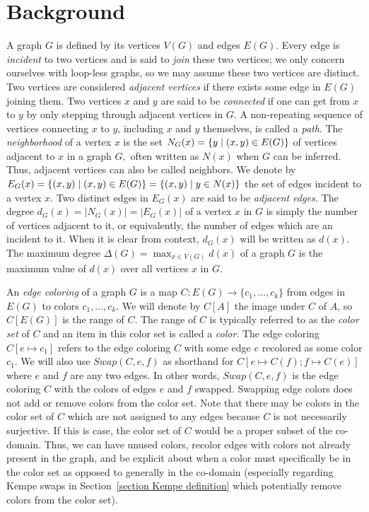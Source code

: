 \section{Background}\label{section background}
A graph $G$ is defined by its vertices $V(G)$ and edges $E(G).$ Every edge is \textit{incident} to two vertices and is said to \textit{join} these two vertices; we only concern ourselves with loop-less graphs, so we may assume these two vertices are distinct. Two vertices are considered \textit{adjacent vertices} if there exists some edge in $E(G)$ joining them. Two vertices $x$ and $y$ are said to be \textit{connected} if one can get from $x$ to $y$ by only stepping through adjacent vertices in $G.$ A non-repeating sequence of vertices connecting $x$ to $y$, including $x$ and $y$ themselves, is called a \textit{path}. The \textit{neighborhood} of a vertex $x$ is the set $N_G(x) = \{y \mid (x, y) \in E(G)\}$ of vertices adjacent to $x$ in a graph $G,$ often written as $N(x)$ when $G$ can be inferred. Thus, adjacent vertices can also be called neighbors. We denote by $E_G(x) = \{(x, y) \mid (x, y) \in E(G)\} = \{(x, y) \mid y \in N(x)\}$ the set of edges incident to a vertex $x.$ Two distinct edges in $E_G(x)$ are said to be \textit{adjacent edges.} The degree $d_G(x) = |N_G(x)| = |E_G(x)|$ of a vertex $x$ in $G$ is simply the number of vertices adjacent to it, or equivalently, the number of edges which are an incident to it. When it is clear from context, $d_G(x)$ will be written as $d(x).$ The maximum degree $\Delta(G) = \max_{x \in V(G)}d(x)$ of a graph $G$ is the maximum value of $d(x)$ over all vertices $x$ in $G.$

An \textit{edge coloring} of a graph $G$ is a map $C : E(G) \to \{c_1, \dots, c_k\}$ from edges in $E(G)$ to colors $c_1, \dots, c_k.$ We will denote by $C[A]$ the image under $C$ of $A$, so $C[E(G)]$ is the range of $C$. The range of $C$ is typically referred to as the \textit{color set} of $C$ and an item in this color set is called a \textit{color}. The edge coloring $C[e \mapsto c_1]$ refers to the edge coloring $C$ with some edge $e$ recolored as some color $c_1$. We will also use $Swap(C, e, f)$ as shorthand for $C[e \mapsto C(f); f \mapsto C(e)]$ where $e$ and $f$ are any two edges. In other words, $Swap(C, e, f)$ is the edge coloring $C$ with the colors of edges $e$ and $f$ swapped. Swapping edge colors does not add or remove colors from the color set. Note that there may be colors in the color set of $C$ which are not assigned to any edges because $C$ is not necessarily surjective. If this is case, the color set of $C$ would be a proper subset of the co-domain. Thus, we can have unused colors, recolor edges with colors not already present in the graph, and be explicit about when a color must specifically be in the color set as opposed to generally in the co-domain (especially regarding Kempe swaps in Section~\ref{section Kempe definition} which potentially remove colors from the color set).

